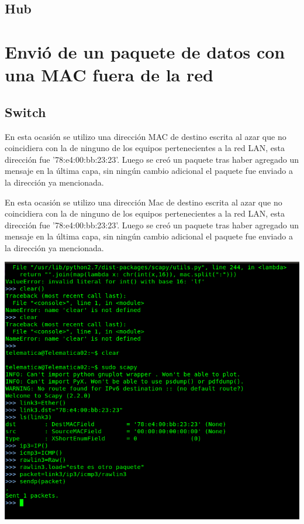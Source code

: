 ﻿\documentclass[spanish]{udpreport}
\begin{document}
\subsection{Hub}

\section{Envió de un paquete de datos con una MAC fuera de la red}
\subsection{Switch}

En esta ocasión se utilizo una dirección MAC de destino escrita al azar que no coincidiera con la de ninguno de los equipos pertenecientes a la red LAN, esta dirección fue ’78:e4:00:bb:23:23’. Luego se creó un paquete tras haber agregado un mensaje en la última capa, sin ningún cambio adicional el paquete fue enviado a la dirección ya mencionada.

En esta ocasión se utilizo una dirección Mac de destino escrita al azar que no coincidiera con la de ninguno de los equipos pertenecientes a la red LAN, esta dirección fue ’78:e4:00:bb:23:23’. Luego se creó un paquete tras haber agregado un mensaje en la última capa, sin ningún cambio adicional el paquete fue enviado a la dirección ya mencionada.


\begin{center}
	\includegraphics[scale=.37]{imagenes/Switch/Test_3.png}
\end{center}
\end{document}
